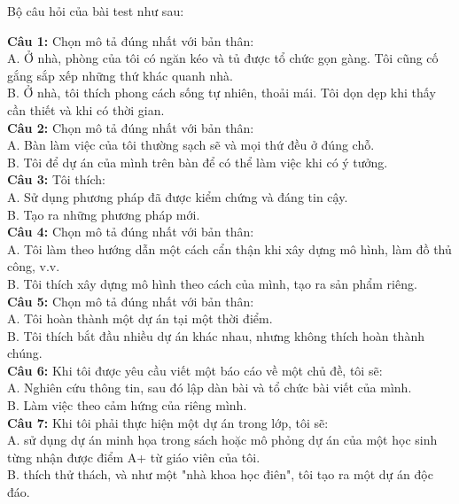 Bộ câu hỏi của bài test như sau:
\begin{multicols}{2}
\noindent
\textbf{Câu 1:} Chọn mô tả đúng nhất với bản thân: \\
A. Ở nhà, phòng của tôi có ngăn kéo và tủ được tổ chức gọn gàng. Tôi cũng cố gắng sắp xếp những thứ khác quanh nhà. \\
B. Ở nhà, tôi thích phong cách sống tự nhiên, thoải mái. Tôi dọn dẹp khi thấy cần thiết và khi có thời gian. \\

\textbf{Câu 2:} Chọn mô tả đúng nhất với bản thân: \\
A. Bàn làm việc của tôi thường sạch sẽ và mọi thứ đều ở đúng chỗ. \\
B. Tôi để dự án của mình trên bàn để có thể làm việc khi có ý tưởng. \\

\textbf{Câu 3:} Tôi thích: \\
A. Sử dụng phương pháp đã được kiểm chứng và đáng tin cậy. \\
B. Tạo ra những phương pháp mới. \\

\textbf{Câu 4:} Chọn mô tả đúng nhất với bản thân: \\
A. Tôi làm theo hướng dẫn một cách cẩn thận khi xây dựng mô hình, làm đồ thủ công, v.v. \\
B. Tôi thích xây dựng mô hình theo cách của mình, tạo ra sản phẩm riêng. \\

\textbf{Câu 5:} Chọn mô tả đúng nhất với bản thân: \\
A. Tôi hoàn thành một dự án tại một thời điểm. \\
B. Tôi thích bắt đầu nhiều dự án khác nhau, nhưng không thích hoàn thành chúng. \\

\textbf{Câu 6:} Khi tôi được yêu cầu viết một báo cáo về một chủ đề, tôi sẽ: \\
A. Nghiên cứu thông tin, sau đó lập dàn bài và tổ chức bài viết của mình. \\
B. Làm việc theo cảm hứng của riêng mình. \\

\textbf{Câu 7:} Khi tôi phải thực hiện một dự án trong lớp, tôi sẽ: \\
A. sử dụng dự án minh họa trong sách hoặc mô phỏng dự án của một học sinh từng nhận được điểm A+ từ giáo viên của tôi. \\
B. thích thử thách, và như một "nhà khoa học điên", tôi tạo ra một dự án độc đáo. \\


\end{multicols}
